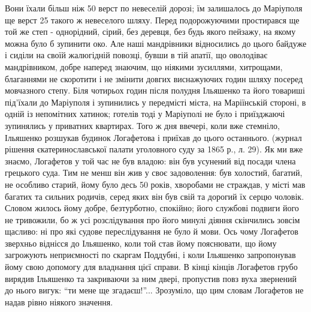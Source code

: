 \documentclass[a4paper,20pt]{report}
\begin{document}
Вони їхали більш ніж 50 верст по невеселій дорозі; їм залишалось до Маріуполя
ще верст 25 такого ж невеселого шляху.  Перед подорожуючими простирався ще той
же степ - однорідний, сірий, без деревця, без будь якого пейзажу, на якому можна було б зупинити око.
Але наші мандрівники відносились до цього байдуже і сиділи на своїй жалюгідній
повозці, бувши в тій апатії, що оволодіває мандрівником, добре наперед знаючим,
що ніякими зусиллями, хитрощами, благаннями не скоротити і не
змінити довгих виснажуючих годин шляху посеред мовчазного степу.
Біля чотирьох годин після полудня Ільяшенко та його товариші під'їхали до Маріуполя
і зупинились у передмісті міста, на Маріїнській стороні, в одній із непомітних хатинок;
готелів тоді у Маріуполі не було і приїзджаючі зупинялись у приватних квартирах. Того ж дня ввечері,
коли вже стемніло, Ільяшенко розшукав будинок Логафетова і приїхав до цього останнього.
(журнал рішення єкатеринославської палати уголовного суду за 1865 р., л. 29). Як ми вже знаємо, 
Логафетов у той час не був владою: він був усунений від посади члена грецького суда. Тим не менш він
жив у своє задоволення: був холостий, багатий, не особливо старий, йому було десь 50 років, хворобами
не страждав, у місті мав багатих та сильних родичів, серед яких він був свій та дорогий їх серцю чоловік.
Словом жилось йому добре, безтурботно, спокійно; його службові подвиги його не тривожили, бо ж усі розслідування
про його минулі діяння скінчились зовсім щасливо: ні про які судове переслідування не було й мови. Ось чому Логафетов
зверхньо віднісся до Ільяшенко, коли той став йому пояснювати, що йому загрожують неприємності
по скаргам Поддубні, і коли Ільяшенко запропонував йому свою допомогу для владнання цієї справи. В кінці кінців
Логафетов грубо вирядив Ільяшенко та закриваючи за ним двері, пропустив повз вуха звернений до нього
вигук: ``ти мене ще згадаєш!''... Зрозуміло, що цим словам Логафетов не надав рівно ніякого значення.
\end{document}
